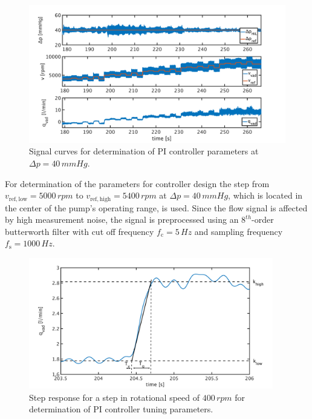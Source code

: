 \begin{figure}[ht]
  \centering
  \includegraphics[width=\textwidth]{images/chapt_5/dyn_meas_40.pdf}
  \caption[Signal curves for determination of PI controller parameters at $\Delta{p}=40\,mmHg$]{Signal curves for determination of PI controller parameters at $\Delta{p}=40\,mmHg$.}
  \label{fig:dyn_meas_40}
\end{figure}
For determination of the parameters for controller design the step from $v_{\mathrm{ref,low}}=5000\, rpm$ to $v_{\mathrm{ref,high}}=5400\, rpm$ at $\Delta{p}=40\,mmHg$, which is located in the center of the pump's operating range, is used.
Since the flow signal is affected by high measurement noise, the signal is preprocessed using an $8^{th}$-order butterworth filter with cut off frequency $f_{\mathrm{c}}=5\,Hz$ and sampling frequency $f_{\mathrm{s}}=1000\,Hz$.
\begin{figure}[ht]
  \centering
  \includegraphics[width=0.95\textwidth]{images/chapt_5/param_calc_PI.pdf}
  \caption[Step response for determination of PI controller tuning parameters]{Step response for a step in rotational speed of $400\,rpm$ for determination of PI controller tuning parameters.}
  \label{fig:param_calc_PI}
\end{figure}
